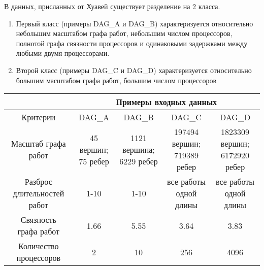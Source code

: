 В данных, присланных от Хуавей существует разделение на 2 класса.
\begin{enumerate}
    \item Первый класс (примеры DAG\_A и DAG\_B) характеризуется относительно небольшим масштабом графа работ, небольшим числом процессоров, полнотой графа связности процессоров и одинаковыми задержками между любыми двумя процессорами.
    \item Второй класс (примеры DAG\_C и DAG\_D) характеризуется относительно большим масштабом графа работ, большим числом процессоров
\end{enumerate}
\begin{table}[!htbp]
    \begin{tabular}{c|c|c|c|c}
        & \multicolumn{4}{c}{Примеры входных данных}                            \\
        \hline
        Критерии            & DAG\_A                                     & DAG\_B & DAG\_C & DAG\_D \\
        \hline
        Масштаб графа работ & \makecell{45 вершин;                                                  \\75 ребер}                        & \makecell{1121 вершина;\\6229 ребер} & \makecell{197494 вершин;\\719389 ребер} & \makecell{1823309 вершин;\\6172920 ребер} \\
        \hline
        \makecell{Разброс                                                                           \\длительностей работ}            & 1-10                                       & 1-10   & \makecell{все работы\\одной длины} & \makecell{все работы\\одной длины} \\
        \hline
        \makecell{Связность                                                                         \\графа работ}                  & 1.66                                       & 5.55   & 3.64                   & 3.83                   \\
        \hline
        \makecell{Количество                                                                        \\процессоров}                 & 2                                          & 10     & 256                    & 4096                   \\

\end{tabular}
\end{table}
